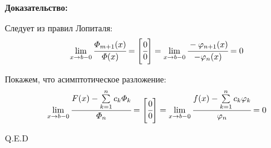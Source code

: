 \textbf{Доказательство:}

Следует из правил Лопиталя:
$$\lim\limits_{x\rightarrow b-0} \cfrac{\varPhi_{m+1}(x)}{\varPhi(x)} = \left[\cfrac{0}{0}\right] = \lim\limits_{x\rightarrow b-0} \cfrac{-\varphi_{n+1}(x)}{-\varphi_n(x)}= 0 $$

Покажем, что асимптотическое  разложение:
$$\lim\limits_{x\rightarrow b-0} \cfrac{F(x) - \sum\limits_{k=1}^n c_k\varPhi_k}{\varPhi_n} = \left[\cfrac{0}{0}\right] = \lim\limits_{x \rightarrow b-0} \cfrac{f(x)- \sum\limits_{k=1}^n c_k \varphi_k}{\varphi_n}=0$$

\hfill Q.E.D